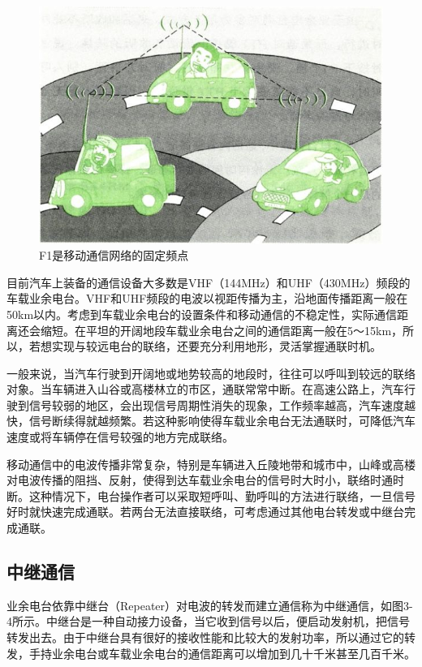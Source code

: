 \documentclass[12pt,UTF8]{ctexbook}
\begin{document}
\begin{figure}[htbp]
	\centering
	\includegraphics[width=0.7\linewidth]{37}
	\caption{F1是移动通信网络的固定频点}
	\label{fig:1}
\end{figure}

目前汽车上装备的通信设备大多数是VHF（144MHz）和UHF（430MHz）频段的车载业余电台。VHF和UHF频段的电波以视距传播为主，沿地面传播距离一般在50km以内。考虑到车载业余电台的设置条件和移动通信的不稳定性，实际通信距离还会缩短。在平坦的开阔地段车载业余电台之间的通信距离一般在5～15km，所以，若想实现与较远电台的联络，还要充分利用地形，灵活掌握通联时机。

一般来说，当汽车行驶到开阔地或地势较高的地段时，往往可以呼叫到较远的联络对象。当车辆进入山谷或高楼林立的市区，通联常常中断。在高速公路上，汽车行驶到信号较弱的地区，会出现信号周期性消失的现象，工作频率越高，汽车速度越快，信号断续得就越频繁。若这种影响使得车载业余电台无法通联时，可降低汽车速度或将车辆停在信号较强的地方完成联络。

移动通信中的电波传播非常复杂，特别是车辆进入丘陵地带和城市中，山峰或高楼对电波传播的阻挡、反射，使得到达车载业余电台的信号时大时小，联络时通时断。这种情况下，电台操作者可以采取短呼叫、勤呼叫的方法进行联络，一旦信号好时就快速完成通联。若两台无法直接联络，可考虑通过其他电台转发或中继台完成通联。

\subsection{中继通信}

业余电台依靠中继台（Repeater）对电波的转发而建立通信称为中继通信，如图3-4所示。中继台是一种自动接力设备，当它收到信号以后，便启动发射机，把信号转发出去。由于中继台具有很好的接收性能和比较大的发射功率，所以通过它的转发，手持业余电台或车载业余电台的通信距离可以增加到几十千米甚至几百千米。
\end{document}
